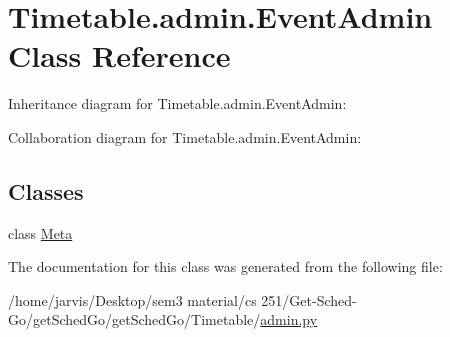 \hypertarget{classTimetable_1_1admin_1_1EventAdmin}{}\section{Timetable.\+admin.\+Event\+Admin Class Reference}
\label{classTimetable_1_1admin_1_1EventAdmin}


Inheritance diagram for Timetable.\+admin.\+Event\+Admin\+:


Collaboration diagram for Timetable.\+admin.\+Event\+Admin\+:
\subsection*{Classes}
\begin{DoxyCompactItemize}
\item 
class \hyperlink{classTimetable_1_1admin_1_1EventAdmin_1_1Meta}{Meta}
\end{DoxyCompactItemize}


The documentation for this class was generated from the following file\+:\begin{DoxyCompactItemize}
\item 
/home/jarvis/\+Desktop/sem3 material/cs 251/\+Get-\/\+Sched-\/\+Go/get\+Sched\+Go/get\+Sched\+Go/\+Timetable/\hyperlink{Timetable_2admin_8py}{admin.\+py}\end{DoxyCompactItemize}
